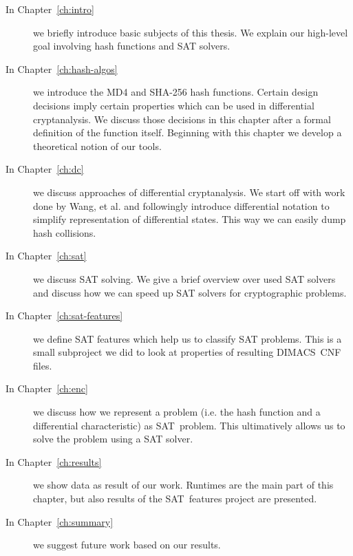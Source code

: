 \begin{description}
\item[In Chapter~\ref{ch:intro}] we briefly introduce basic subjects of this
  thesis. We explain our high-level goal involving hash functions and SAT solvers.

\item[In Chapter~\ref{ch:hash-algos}] we introduce the MD4 and SHA-256 hash functions.
  Certain design decisions imply certain properties which can be used in differential
  cryptanalysis. We discuss those decisions in this chapter after a formal definition
  of the function itself. Beginning with this chapter we develop a theoretical notion
  of our tools.

\item[In Chapter~\ref{ch:dc}] we discuss approaches of differential cryptanalysis.
  We start off with work done by Wang, et al. and followingly introduce differential
  notation to simplify representation of differential states. This way we can easily dump
  hash collisions.

\item[In Chapter~\ref{ch:sat}] we discuss SAT solving. We give a brief overview
  over used SAT solvers and discuss how we can speed up SAT solvers for cryptographic
  problems.

\item[In Chapter~\ref{ch:sat-features}] we define SAT features which help us to
  classify SAT problems. This is a small subproject we did to look at properties
  of resulting DIMACS~CNF files.

\item[In Chapter~\ref{ch:enc}] we discuss how we represent a problem (i.e. the hash
  function and a differential characteristic) as SAT~problem. This ultimatively
  allows us to solve the problem using a SAT solver.

\item[In Chapter~\ref{ch:results}] we show data as result of our work.
  Runtimes are the main part of this chapter, but also results of the SAT~features
  project are presented.

\item[In Chapter~\ref{ch:summary}] we suggest future work based on our results.
\end{description}
